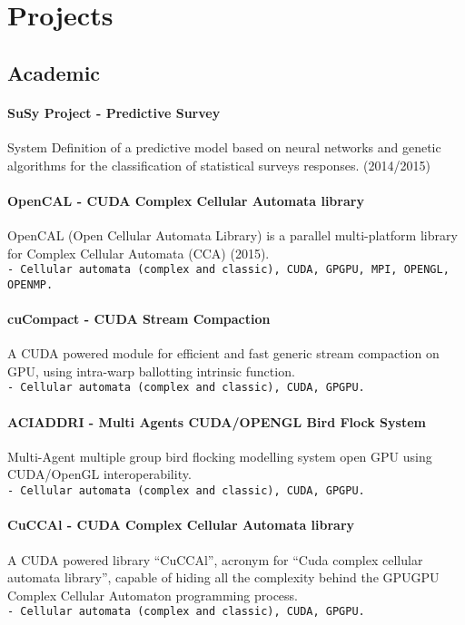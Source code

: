 \documentclass[a4paper,10pt]{article}
\begin{document}
\section{Projects}

\subsection{Academic}
 \paragraph{SuSy Project - Predictive Survey}
 System Definition of a predictive
 model based on neural networks and genetic algorithms for the classification of
 statistical surveys responses. (2014/2015)

\paragraph{OpenCAL - CUDA Complex Cellular Automata library} 
OpenCAL (Open Cellular Automata Library) is a parallel multi-platform library
for Complex Cellular Automata (CCA) (2015).
\hfill \\
\texttt{- \noindent Cellular automata (complex and classic), CUDA, GPGPU, MPI, OPENGL,
OPENMP.}
 
 \paragraph{cuCompact - CUDA Stream Compaction} 
A CUDA powered module for efficient and fast generic stream compaction on GPU,
using intra-warp ballotting intrinsic function. 
\hfill \\
\texttt{- 
\noindent Cellular automata (complex and classic), CUDA, GPGPU.}

 \paragraph{ACIADDRI - Multi Agents CUDA/OPENGL Bird Flock System} 
Multi-Agent multiple group bird flocking modelling system open GPU using
CUDA/OpenGL interoperability.
\hfill \\
\texttt{- 
\noindent Cellular automata (complex and classic), CUDA, GPGPU.}


\paragraph{CuCCAl - CUDA Complex Cellular Automata library} 
A CUDA powered library “CuCCAl”, acronym for “Cuda complex cellular
automata library”, capable of hiding all the complexity behind the GPUGPU
Complex Cellular Automaton programming process.
\hfill \\
\texttt{- 
\noindent Cellular automata (complex and classic), CUDA, GPGPU.}
\end{document}
